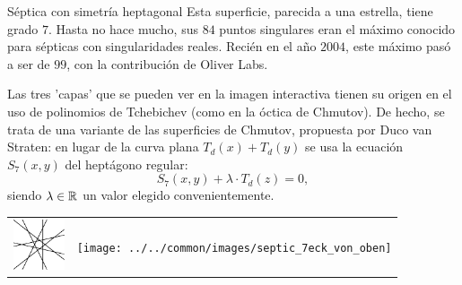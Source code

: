 \begin{surferPage}{Séptica con simetría heptagonal}
    Esta superficie, parecida a una estrella, tiene grado $7$. 
    Hasta no hace mucho, sus $84$ puntos singulares eran el máximo conocido para sépticas
    con singularidades reales. Recién en el año $2004$, este máximo pasó a ser de $99$, 
    con la contribución de Oliver Labs.
    
    Las tres 'capas' que se pueden ver en la imagen interactiva tienen su origen
    en el uso de polinomios de Tchebichev (como en la óctica de Chmutov).  
    De hecho, se trata de una variante de las superficies de Chmutov, propuesta por Duco van Straten:
    en lugar de la curva plana $T_d(x)+T_d(y)$ se usa la ecuación
    $S_7(x,y)$ del heptágono regular: 
    \[S_7(x,y) + \lambda \cdot T_d(z) = 0,\]
    siendo $\lambda\in{\mathbb R}$ un valor elegido convenientemente.

  
    \vspace*{-0.3em}
    \begin{center}
      \begin{tabular}{c@{\qquad}c}
        \includegraphics[height=1.5cm]{../../common/images/labsseptic1.pdf}
        &
        \texttt{[image: ../../common/images/septic\_7eck\_von\_oben]}
      \end{tabular}
    \end{center}
    \vspace*{-0.3em}
\end{surferPage}
